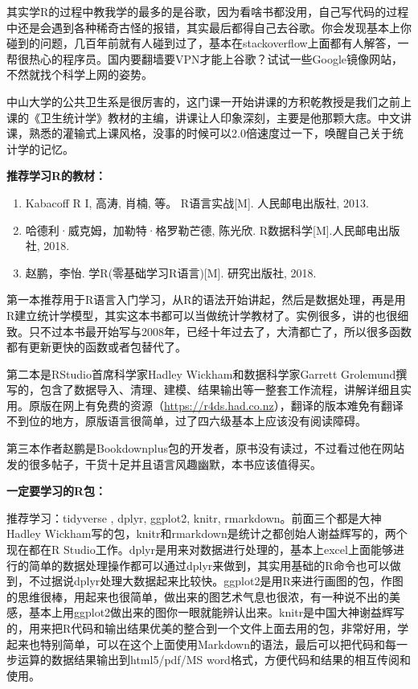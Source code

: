 \documentclass[11pt, a4paper]{article}
\begin{document}
其实学R的过程中教我学的最多的是谷歌，因为看啥书都没用，自己写代码的过程中还是会遇到各种稀奇古怪的报错，其实最后都得自己去谷歌。你会发现基本上你碰到的问题，几百年前就有人碰到过了，基本在stackoverflow上面都有人解答，一帮很热心的程序员。国内要翻墙要VPN才能上谷歌？试试一些Google镜像网站，不然就找个科学上网的姿势。

中山大学的公共卫生系是很厉害的，这门课一开始讲课的方积乾教授是我们之前上课的《卫生统计学》教材的主编，讲课让人印象深刻，主要是他那颗大痣。中文讲课，熟悉的灌输式上课风格，没事的时候可以2.0倍速度过一下，唤醒自己关于统计学的记忆。

\textbf{推荐学习R的教材：}
\begin{enumerate}[(1)]
	\item Kabacoff R I, 高涛, 肖楠, 等。 R语言实战[M]. 人民邮电出版社, 2013.
	\item 哈德利·威克姆，加勒特·格罗勒芒德, 陈光欣. R数据科学[M].人民邮电出版社, 2018.
	\item 赵鹏，李怡. 学R(零基础学习R语言)[M]. 研究出版社, 2018.
\end{enumerate}

第一本推荐用于R语言入门学习，从R的语法开始讲起，然后是数据处理，再是用R建立统计学模型，其实这本书都可以当做统计学教材了。实例很多，讲的也很细致。只不过本书最开始写与2008年，已经十年过去了，大清都亡了，所以很多函数都有更新更快的函数或者包替代了。

第二本是RStudio首席科学家Hadley Wickham和数据科学家Garrett Grolemund撰写的，包含了数据导入、清理、建模、结果输出等一整套工作流程，讲解详细且实用。原版在网上有免费的资源（\url{https://r4ds.had.co.nz}），翻译的版本难免有翻译不到位的地方，原版语言很简单，过了四六级基本上应该没有阅读障碍。

第三本作者赵鹏是Bookdownplus包的开发者，原书没有读过，不过看过他在网站发的很多帖子，干货十足并且语言风趣幽默，本书应该值得买。

\textbf{一定要学习的R包：}

推荐学习：tidyverse , dplyr, ggplot2, knitr, rmarkdown。前面三个都是大神Hadley Wickham写的包，knitr和rmarkdown是统计之都创始人谢益辉写的，两个现在都在R Studio工作。dplyr是用来对数据进行处理的，基本上excel上面能够进行的简单的数据处理操作都可以通过dplyr来做到，其实用基础的R命令也可以做到，不过据说dplyr处理大数据起来比较快。ggplot2是用R来进行画图的包，作图的思维很棒，用起来也很简单，做出来的图艺术气息也很浓，有一种说不出的美感，基本上用ggplot2做出来的图你一眼就能辨认出来。knitr是中国大神谢益辉写的，用来把R代码和输出结果优美的整合到一个文件上面去用的包，非常好用，学起来也特别简单，可以在这个上面使用Markdown的语法，最后可以把代码和每一步运算的数据结果输出到html5/pdf/MS word格式，方便代码和结果的相互传阅和使用。
\end{document}

